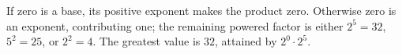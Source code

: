 If zero is a base, its positive exponent makes the product zero. Otherwise zero is an exponent, contributing one; the remaining powered factor is either $2^5=32$, $5^2=25$, or $2^2=4$. The greatest value is $\boxed{32}$, attained by $2^0\cdot2^5$.
